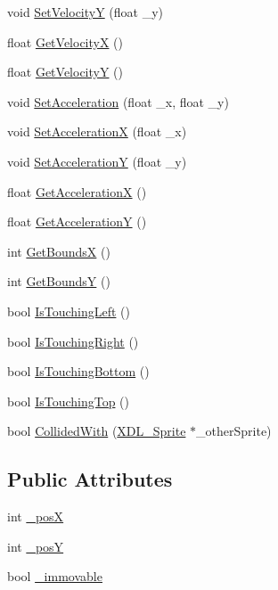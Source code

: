 \begin{DoxyCompactItemize}
\item 
void \hyperlink{class_x_d_l___sprite_a1a18ddd214edc5dc4467788ab4521278}{Set\-Velocity\-Y} (float \-\_\-y)
\item 
float \hyperlink{class_x_d_l___sprite_a6611b121ce2b1c1ce0528d2654b8d892}{Get\-Velocity\-X} ()
\item 
float \hyperlink{class_x_d_l___sprite_aea28ba1c38e25c5dea64242077baecc8}{Get\-Velocity\-Y} ()
\item 
void \hyperlink{class_x_d_l___sprite_ae76446bfda310004fb0e82aa4bc381b2}{Set\-Acceleration} (float \-\_\-x, float \-\_\-y)
\item 
void \hyperlink{class_x_d_l___sprite_accdd48de72031a7d341e3b54ba872eab}{Set\-Acceleration\-X} (float \-\_\-x)
\item 
void \hyperlink{class_x_d_l___sprite_ab4450a47156875166b1c7bbdb8925cad}{Set\-Acceleration\-Y} (float \-\_\-y)
\item 
float \hyperlink{class_x_d_l___sprite_a4c1df412244bf6297fe1eb954f50f01e}{Get\-Acceleration\-X} ()
\item 
float \hyperlink{class_x_d_l___sprite_a9e8ae0bcfa1a8035bfbae8fada4c2832}{Get\-Acceleration\-Y} ()
\item 
int \hyperlink{class_x_d_l___sprite_a6da8034879ffa9e7aca7c626e5aa8502}{Get\-Bounds\-X} ()
\item 
int \hyperlink{class_x_d_l___sprite_a3fb8f03176ff81df621d761d6d31d722}{Get\-Bounds\-Y} ()
\item 
bool \hyperlink{class_x_d_l___sprite_ace2f0a749d46d100d7790441e364a748}{Is\-Touching\-Left} ()
\item 
bool \hyperlink{class_x_d_l___sprite_af49247e1e7c9de16c011b30ccbabffca}{Is\-Touching\-Right} ()
\item 
bool \hyperlink{class_x_d_l___sprite_abbba239d01bca58ed6e01577f32d16c6}{Is\-Touching\-Bottom} ()
\item 
bool \hyperlink{class_x_d_l___sprite_aa2415ef43a0ac95141ac983f2360e432}{Is\-Touching\-Top} ()
\item 
bool \hyperlink{class_x_d_l___sprite_ac8a10902cbbfc8e06c90a3eaabdee960}{Collided\-With} (\hyperlink{class_x_d_l___sprite}{X\-D\-L\-\_\-\-Sprite} $\ast$\-\_\-other\-Sprite)
\end{DoxyCompactItemize}
\subsection*{Public Attributes}
\begin{DoxyCompactItemize}
\item 
int \hyperlink{class_x_d_l___sprite_ac7671bf39741642f55368690a562fff8}{\-\_\-pos\-X}
\item 
int \hyperlink{class_x_d_l___sprite_a2e69aab364da9c9e16ae398838679065}{\-\_\-pos\-Y}
\item 
bool \hyperlink{class_x_d_l___sprite_a0eb0c96cddb007d3045232b4c7492918}{\-\_\-immovable}
\end{DoxyCompactItemize}
